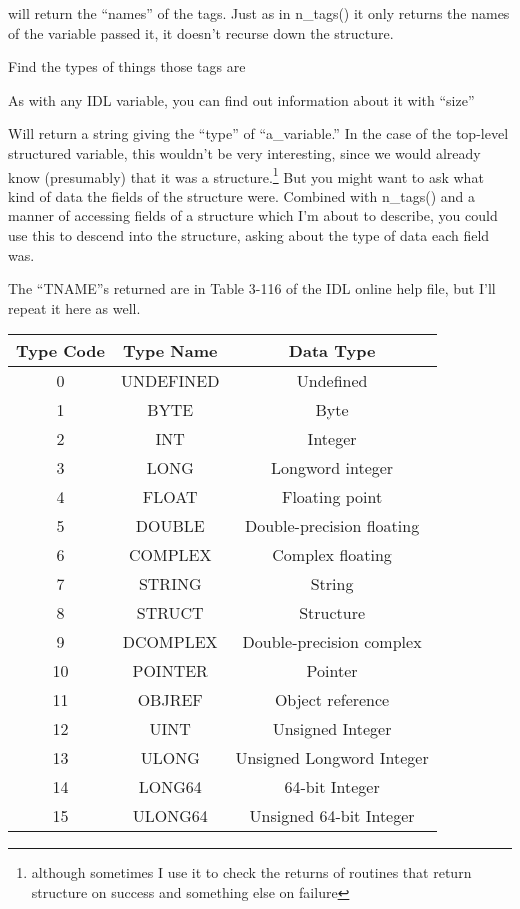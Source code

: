      will return the ``names'' of the tags. Just as in n\_tags() it
     only returns the names of the variable passed it, it doesn't
     recurse down the structure.

  \item Find the types of things those tags are
    
    As with any IDL variable, you can find out information about it
    with ``size''

    
    Will return a string giving the ``type'' of ``a\_variable.'' In
    the case of the top-level structured variable, this wouldn't be
    very interesting, since we would already know (presumably) that it
    was a structure.\footnote{although sometimes I use it to check the
    returns of routines that return structure on success and
    something else on failure} But you might want to ask what kind
    of data the    fields of the structure were. Combined with n\_tags() and a manner
    of accessing fields of a structure which I'm about to describe,
    you could use this to descend into the structure, asking about the
    type of data each field was.
    
    The ``TNAME''s returned are in Table 3-116 of the IDL online help
    file, but I'll repeat it here as well.


\begin{center}
\begin{tabular}{||c|c|c|} \hline
Type Code & Type Name & Data Type \\ \hline
0  & UNDEFINED & Undefined \\
1  & BYTE     & Byte       \\
2  & INT      & Integer    \\                 
3  & LONG     & Longword integer \\
4  & FLOAT    & Floating point   \\         
5  & DOUBLE   & Double-precision floating \\
6  & COMPLEX  & Complex floating          \\
7  & STRING   & String                     \\
8  & STRUCT   & Structure                  \\
9  & DCOMPLEX & Double-precision complex \\
10 & POINTER  & Pointer \\
11 & OBJREF   & Object reference \\
12 & UINT     & Unsigned Integer \\
13 & ULONG    & Unsigned Longword Integer \\
14 & LONG64   & 64-bit Integer \\
15 & ULONG64  &  Unsigned 64-bit Integer \\ \hline
\end{tabular}
\end{center}

